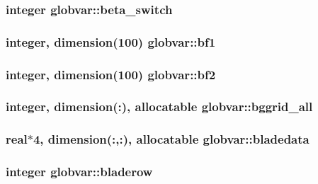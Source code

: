 \subsubsection[{beta\+\_\+switch}]{\setlength{\rightskip}{0pt plus 5cm}integer globvar\+::beta\+\_\+switch}\label{namespaceglobvar_ac2f0dd583ec6012e046c832b73410878}
\hypertarget{namespaceglobvar_aed39a88b831b27b5b463d57a00a79f88}{}
\subsubsection[{bf1}]{\setlength{\rightskip}{0pt plus 5cm}integer, dimension(100) globvar\+::bf1}\label{namespaceglobvar_aed39a88b831b27b5b463d57a00a79f88}
\hypertarget{namespaceglobvar_ac00ea6ddd54af474c45fe888882c8a54}{}
\subsubsection[{bf2}]{\setlength{\rightskip}{0pt plus 5cm}integer, dimension(100) globvar\+::bf2}\label{namespaceglobvar_ac00ea6ddd54af474c45fe888882c8a54}
\hypertarget{namespaceglobvar_a62db14137ca5f48f595e1008d33688ab}{}
\subsubsection[{bggrid\+\_\+all}]{\setlength{\rightskip}{0pt plus 5cm}integer, dimension(\+:), allocatable globvar\+::bggrid\+\_\+all}\label{namespaceglobvar_a62db14137ca5f48f595e1008d33688ab}
\hypertarget{namespaceglobvar_a19f797343d8c12180411f1e3f50c5209}{}
\subsubsection[{bladedata}]{\setlength{\rightskip}{0pt plus 5cm}real$\ast$4, dimension(\+:,\+:), allocatable globvar\+::bladedata}\label{namespaceglobvar_a19f797343d8c12180411f1e3f50c5209}
\hypertarget{namespaceglobvar_ae77b9f21d86127ac705b4176dd89f3e7}{}
\subsubsection[{bladerow}]{\setlength{\rightskip}{0pt plus 5cm}integer globvar\+::bladerow}\label{namespaceglobvar_ae77b9f21d86127ac705b4176dd89f3e7}
\hypertarget{namespaceglobvar_afebc24dd143d18989fbeb7223a277ab8}{}
